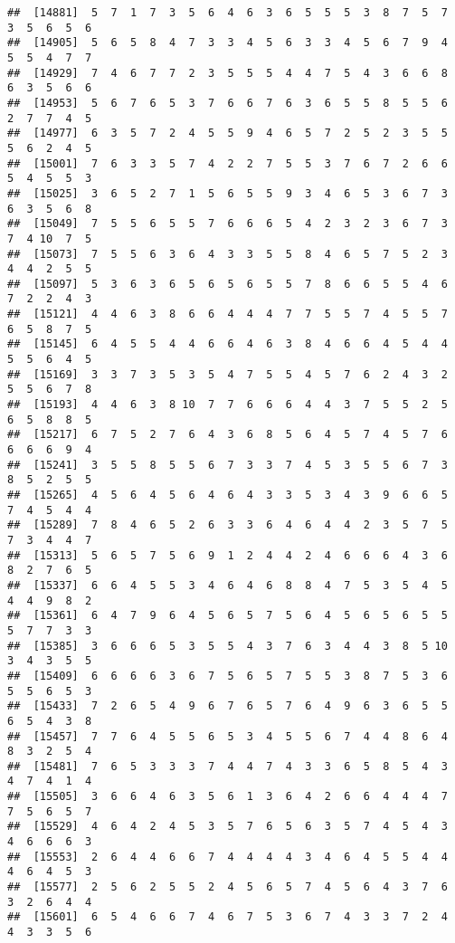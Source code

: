 \documentclass[
]{book}
\begin{document}
\begin{verbatim}
##  [14881]  5  7  1  7  3  5  6  4  6  3  6  5  5  5  3  8  7  5  7  3  5  6  5  6
##  [14905]  5  6  5  8  4  7  3  3  4  5  6  3  3  4  5  6  7  9  4  5  5  4  7  7
##  [14929]  7  4  6  7  7  2  3  5  5  5  4  4  7  5  4  3  6  6  8  6  3  5  6  6
##  [14953]  5  6  7  6  5  3  7  6  6  7  6  3  6  5  5  8  5  5  6  2  7  7  4  5
##  [14977]  6  3  5  7  2  4  5  5  9  4  6  5  7  2  5  2  3  5  5  5  6  2  4  5
##  [15001]  7  6  3  3  5  7  4  2  2  7  5  5  3  7  6  7  2  6  6  5  4  5  5  3
##  [15025]  3  6  5  2  7  1  5  6  5  5  9  3  4  6  5  3  6  7  3  6  3  5  6  8
##  [15049]  7  5  5  6  5  5  7  6  6  6  5  4  2  3  2  3  6  7  3  7  4 10  7  5
##  [15073]  7  5  5  6  3  6  4  3  3  5  5  8  4  6  5  7  5  2  3  4  4  2  5  5
##  [15097]  5  3  6  3  6  5  6  5  6  5  5  7  8  6  6  5  5  4  6  7  2  2  4  3
##  [15121]  4  4  6  3  8  6  6  4  4  4  7  7  5  5  7  4  5  5  7  6  5  8  7  5
##  [15145]  6  4  5  5  4  4  6  6  4  6  3  8  4  6  6  4  5  4  4  5  5  6  4  5
##  [15169]  3  3  7  3  5  3  5  4  7  5  5  4  5  7  6  2  4  3  2  5  5  6  7  8
##  [15193]  4  4  6  3  8 10  7  7  6  6  6  4  4  3  7  5  5  2  5  6  5  8  8  5
##  [15217]  6  7  5  2  7  6  4  3  6  8  5  6  4  5  7  4  5  7  6  6  6  6  9  4
##  [15241]  3  5  5  8  5  5  6  7  3  3  7  4  5  3  5  5  6  7  3  8  5  2  5  5
##  [15265]  4  5  6  4  5  6  4  6  4  3  3  5  3  4  3  9  6  6  5  7  4  5  4  4
##  [15289]  7  8  4  6  5  2  6  3  3  6  4  6  4  4  2  3  5  7  5  7  3  4  4  7
##  [15313]  5  6  5  7  5  6  9  1  2  4  4  2  4  6  6  6  4  3  6  8  2  7  6  5
##  [15337]  6  6  4  5  5  3  4  6  4  6  8  8  4  7  5  3  5  4  5  4  4  9  8  2
##  [15361]  6  4  7  9  6  4  5  6  5  7  5  6  4  5  6  5  6  5  5  5  7  7  3  3
##  [15385]  3  6  6  6  5  3  5  5  4  3  7  6  3  4  4  3  8  5 10  3  4  3  5  5
##  [15409]  6  6  6  6  3  6  7  5  6  5  7  5  5  3  8  7  5  3  6  5  5  6  5  3
##  [15433]  7  2  6  5  4  9  6  7  6  5  7  6  4  9  6  3  6  5  5  6  5  4  3  8
##  [15457]  7  7  6  4  5  5  6  5  3  4  5  5  6  7  4  4  8  6  4  8  3  2  5  4
##  [15481]  7  6  5  3  3  3  7  4  4  7  4  3  3  6  5  8  5  4  3  4  7  4  1  4
##  [15505]  3  6  6  4  6  3  5  6  1  3  6  4  2  6  6  4  4  4  7  7  5  6  5  7
##  [15529]  4  6  4  2  4  5  3  5  7  6  5  6  3  5  7  4  5  4  3  4  6  6  6  3
##  [15553]  2  6  4  4  6  6  7  4  4  4  4  3  4  6  4  5  5  4  4  4  6  4  5  3
##  [15577]  2  5  6  2  5  5  2  4  5  6  5  7  4  5  6  4  3  7  6  3  2  6  4  4
##  [15601]  6  5  4  6  6  7  4  6  7  5  3  6  7  4  3  3  7  2  4  4  3  3  5  6

\end{verbatim}
\end{document}
